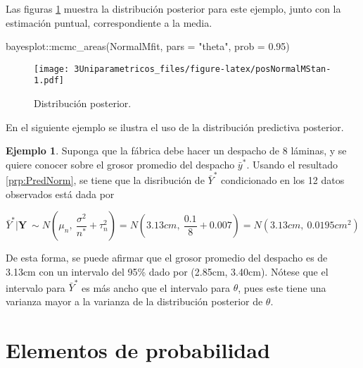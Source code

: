 \documentclass[
  10pt,
  spanish,
]{book}
\newenvironment{Shaded}{\begin{snugshade}}{\end{snugshade}}
\newcommand{\AttributeTok}[1]{\textcolor[rgb]{0.77,0.63,0.00}{#1}}
\newcommand{\FloatTok}[1]{\textcolor[rgb]{0.00,0.00,0.81}{#1}}
\newcommand{\FunctionTok}[1]{\textcolor[rgb]{0.00,0.00,0.00}{#1}}
\newcommand{\NormalTok}[1]{#1}
\newcommand{\SpecialCharTok}[1]{\textcolor[rgb]{0.00,0.00,0.00}{#1}}
\newcommand{\StringTok}[1]{\textcolor[rgb]{0.31,0.60,0.02}{#1}}
\theoremstyle{definition}
\theoremstyle{definition}
\newtheorem{example}{Ejemplo}[chapter]
\theoremstyle{definition}
\theoremstyle{definition}
\theoremstyle{remark}
\begin{document}
Las figuras \ref{fig:posNormalMStan} muestra la distribución posterior para este ejemplo, junto con la estimación puntual, correspondiente a la media.

\begin{Shaded}
\begin{Highlighting}[]
\NormalTok{bayesplot}\SpecialCharTok{::}\FunctionTok{mcmc\_areas}\NormalTok{(NormalMfit, }\AttributeTok{pars =} \StringTok{"theta"}\NormalTok{, }
                      \AttributeTok{prob =} \FloatTok{0.95}\NormalTok{)}
\end{Highlighting}
\end{Shaded}

\begin{figure}
\centering
\texttt{[image: 3Uniparametricos\_files/figure-latex/posNormalMStan-1.pdf]}
\caption{\label{fig:posNormalMStan}Distribución posterior.}
\end{figure}

En el siguiente ejemplo se ilustra el uso de la distribución predictiva posterior.

\begin{example}
\protect\hypertarget{exm:unnamed-chunk-76}{}{\label{exm:unnamed-chunk-76} }Suponga que la fábrica debe hacer un despacho de 8 láminas, y se quiere conocer sobre el grosor promedio del despacho \(\bar{y}^*\). Usando el resultado \ref{prp:PredNorm}, se tiene que la disribución de \(\bar{Y}^*\) condicionado en los 12 datos observados está dada por

\begin{equation*}
\bar{Y}^*|\mathbf{Y}\ \sim N\left(\mu_n,\ \frac{\sigma^2}{n^*}+\tau^2_n\right) = N\left(3.13cm,\ \frac{0.1}{8}+0.007\right) = N(3.13cm,\ 0.0195cm^2)
\end{equation*}

De esta forma, se puede afirmar que el grosor promedio del despacho es de 3.13cm con un intervalo del 95\% dado por (2.85cm, 3.40cm). Nótese que el intervalo para \(\bar{Y}^{*}\) es más ancho que el intervalo para \(\theta\), pues este tiene una varianza mayor a la varianza de la distribución posterior de \(\theta\).
\end{example}

\hypertarget{appendix-apuxe9ndice}{%
\appendix}


\hypertarget{elementos-de-probabilidad}{%
\chapter{Elementos de probabilidad}\label{elementos-de-probabilidad}}
\end{document}
